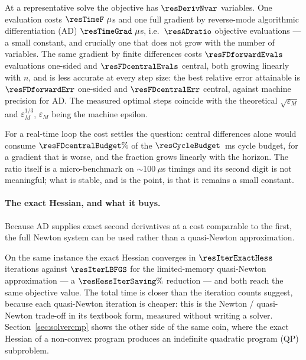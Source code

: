 \documentclass[11pt,a4paper]{article}
\begin{document}
At a representative solve the objective has $\resDerivNvar$ variables. One evaluation costs
$\resTimeF~\mu$s and one full gradient by reverse-mode algorithmic differentiation (AD) $\resTimeGrad~\mu$s,
i.e.\ $\resADratio$ objective evaluations --- a small constant, and crucially one that does not grow with the
number of variables. The same gradient by finite differences costs $\resFDforwardEvals$ evaluations one-sided
and $\resFDcentralEvals$ central, both growing linearly with $n$, and is less accurate at every step size:
the best relative error attainable is $\resFDforwardErr$ one-sided and $\resFDcentralErr$ central, against
machine precision for AD. The measured optimal steps coincide with the theoretical $\sqrt{\varepsilon_M}$ and
$\varepsilon_M^{1/3}$, $\varepsilon_M$ being the machine epsilon.

For a real-time loop the cost settles the question: central differences alone would consume
$\resFDcentralBudget\%$ of the $\resCycleBudget$~ms cycle budget, for a gradient that is worse, and the
fraction grows linearly with the horizon. The ratio itself is a micro-benchmark on
$\sim\!100~\mu$s timings and its second digit is not meaningful; what is stable, and is the point, is that it
remains a small constant.

\paragraph{The exact Hessian, and what it buys.} Because AD supplies exact second derivatives at a cost
comparable to the first, the full Newton system can be used rather than a quasi-Newton approximation.

\begin{table}[htbp]
  \centering
  \small
  \caption{%
  Interior-point iterations with the exact Hessian and with the limited-memory quasi-Newton approximation,
  on the same instance. Bold: the lower iteration count.}
  \label{res:tab:hess}
\end{table}

On the same instance the exact Hessian converges in $\resIterExactHess$ iterations against $\resIterLBFGS$
for the limited-memory quasi-Newton approximation --- a $\resHessIterSaving\%$ reduction --- and both reach
the same objective value. The total time is closer than the iteration counts suggest, because each
quasi-Newton iteration is cheaper: this is the Newton / quasi-Newton trade-off in its textbook form,
measured without writing a solver. Section~\ref{sec:solvercmp} shows the other side of the same coin, where
the exact Hessian of a non-convex program produces an indefinite quadratic
program (QP) subproblem.
\end{document}
